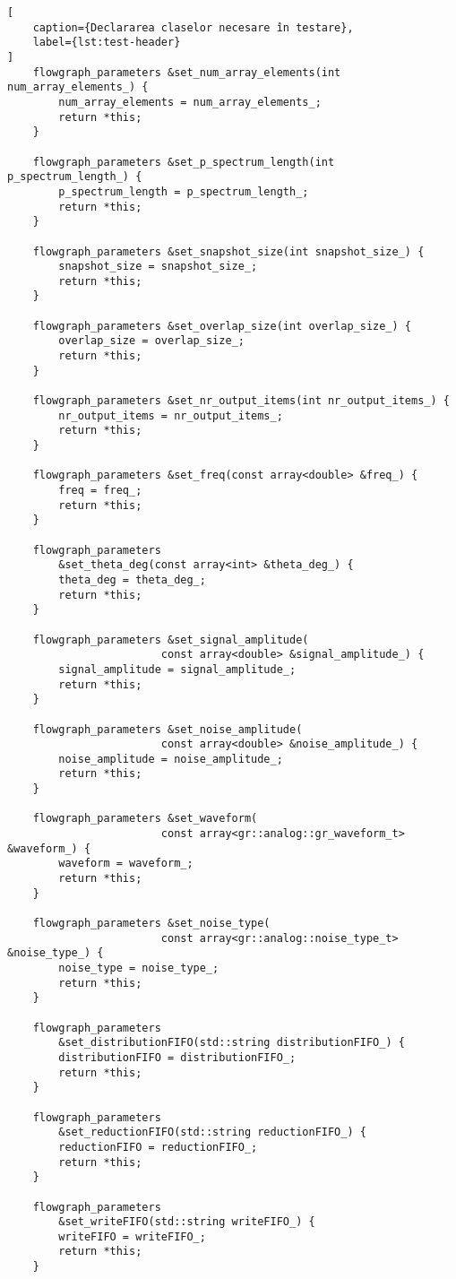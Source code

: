\begin{lstlisting}[
    caption={Declararea claselor necesare în testare},
    label={lst:test-header}
]
    flowgraph_parameters &set_num_array_elements(int num_array_elements_) {
        num_array_elements = num_array_elements_;
        return *this;
    }

    flowgraph_parameters &set_p_spectrum_length(int p_spectrum_length_) {
        p_spectrum_length = p_spectrum_length_;
        return *this;
    }

    flowgraph_parameters &set_snapshot_size(int snapshot_size_) {
        snapshot_size = snapshot_size_;
        return *this;
    }

    flowgraph_parameters &set_overlap_size(int overlap_size_) {
        overlap_size = overlap_size_;
        return *this;
    }

    flowgraph_parameters &set_nr_output_items(int nr_output_items_) {
        nr_output_items = nr_output_items_;
        return *this;
    }

    flowgraph_parameters &set_freq(const array<double> &freq_) {
        freq = freq_;
        return *this;
    }

    flowgraph_parameters
        &set_theta_deg(const array<int> &theta_deg_) {
        theta_deg = theta_deg_;
        return *this;
    }

    flowgraph_parameters &set_signal_amplitude(
                        const array<double> &signal_amplitude_) {
        signal_amplitude = signal_amplitude_;
        return *this;
    }

    flowgraph_parameters &set_noise_amplitude(
                        const array<double> &noise_amplitude_) {
        noise_amplitude = noise_amplitude_;
        return *this;
    }

    flowgraph_parameters &set_waveform(
                        const array<gr::analog::gr_waveform_t> &waveform_) {
        waveform = waveform_;
        return *this;
    }

    flowgraph_parameters &set_noise_type(
                        const array<gr::analog::noise_type_t> &noise_type_) {
        noise_type = noise_type_;
        return *this;
    }

    flowgraph_parameters
        &set_distributionFIFO(std::string distributionFIFO_) {
        distributionFIFO = distributionFIFO_;
        return *this;
    }

    flowgraph_parameters
        &set_reductionFIFO(std::string reductionFIFO_) {
        reductionFIFO = reductionFIFO_;
        return *this;
    }

    flowgraph_parameters
        &set_writeFIFO(std::string writeFIFO_) {
        writeFIFO = writeFIFO_;
        return *this;
    }


\end{lstlisting}
